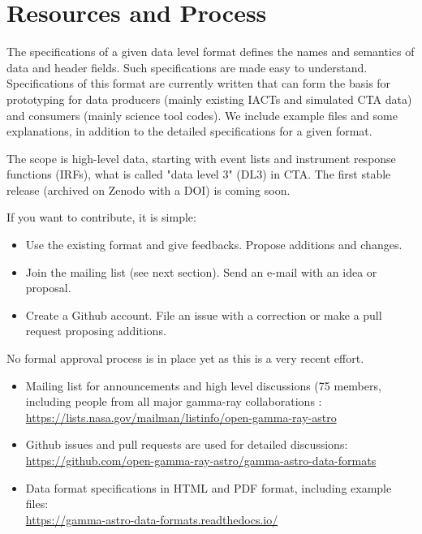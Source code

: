 \section{Resources and Process}


The specifications of a given data level format defines the names and semantics of data and header fields. Such specifications are made easy to understand. Specifications of this format are currently written that can form the basis for prototyping for data producers (mainly existing IACTs and simulated CTA data) and consumers (mainly science tool codes). We include example files and some explanations, in addition to the detailed specifications for a given format. 

The scope is high-level data, starting with event lists and instrument response functions (IRFs), what is called "data level 3" (DL3) in CTA. The first stable release (archived on Zenodo with a DOI) is coming soon.

If you want to contribute, it is simple:

\begin{itemize}
\item{}Use the existing format and give feedbacks. Propose additions and changes.
\item{}Join the mailing list (see next section). Send an e-mail with an idea or proposal.
\item{}Create a Github account. File an issue with a correction or make a pull request proposing additions.
\end{itemize}

No formal approval process is in place yet as this is a very recent effort.


\begin{itemize}
\item{} Mailing list for announcements and high level discussions (75 members, including people from all major gamma-ray collaborations :\\     \url{https://lists.nasa.gov/mailman/listinfo/open-gamma-ray-astro}
\item{}Github issues and pull requests are used for detailed discussions:\\ \url{https://github.com/open-gamma-ray-astro/gamma-astro-data-formats}
\item{}Data format specifications in HTML and PDF format, including example files:\\ \url{https://gamma-astro-data-formats.readthedocs.io/}
\end{itemize}

